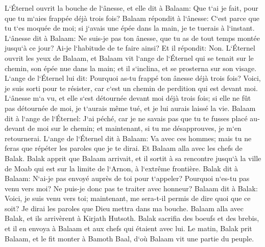\verse L`Éternel ouvrit la bouche de l`ânesse, et elle dit à Balaam: Que t`ai je fait, pour que tu m`aies frappée déjà trois fois? 
\verse Balaam répondit à l`ânesse: C`est parce que tu t`es moquée de moi; si j`avais une épée dans la main, je te tuerais à l`instant. 
\verse L`ânesse dit à Balaam: Ne suis-je pas ton ânesse, que tu as de tout temps montée jusqu`à ce jour? Ai-je l`habitude de te faire ainsi? Et il répondit: Non. 
\verse L`Éternel ouvrit les yeux de Balaam, et Balaam vit l`ange de l`Éternel qui se tenait sur le chemin, son épée nue dans la main; et il s`inclina, et se prosterna sur son visage. 
\verse L`ange de l`Éternel lui dit: Pourquoi as-tu frappé ton ânesse déjà trois fois? Voici, je suis sorti pour te résister, car c`est un chemin de perdition qui est devant moi. 
\verse L`ânesse m`a vu, et elle s`est détournée devant moi déjà trois fois; si elle ne fût pas détournée de moi, je t`aurais même tué, et je lui aurais laissé la vie. 
\verse Balaam dit à l`ange de l`Éternel: J`ai péché, car je ne savais pas que tu te fusses placé au-devant de moi sur le chemin; et maintenant, si tu me désapprouves, je m`en retournerai. 
\verse L`ange de l`Éternel dit à Balaam: Va avec ces hommes; mais tu ne feras que répéter les paroles que je te dirai. Et Balaam alla avec les chefs de Balak. 
\verse Balak apprit que Balaam arrivait, et il sortit à sa rencontre jusqu`à la ville de Moab qui est sur la limite de l`Arnon, à l`extrême frontière. 
\verse Balak dit à Balaam: N`ai-je pas envoyé auprès de toi pour t`appeler? Pourquoi n`es-tu pas venu vers moi? Ne puis-je donc pas te traiter avec honneur? 
\verse Balaam dit à Balak: Voici, je suis venu vers toi; maintenant, me sera-t-il permis de dire quoi que ce soit? Je dirai les paroles que Dieu mettra dans ma bouche. 
\verse Balaam alla avec Balak, et ils arrivèrent à Kirjath Hutsoth. 
\verse Balak sacrifia des boeufs et des brebis, et il en envoya à Balaam et aux chefs qui étaient avec lui. 
\verse Le matin, Balak prit Balaam, et le fit monter à Bamoth Baal, d`où Balaam vit une partie du peuple. 

